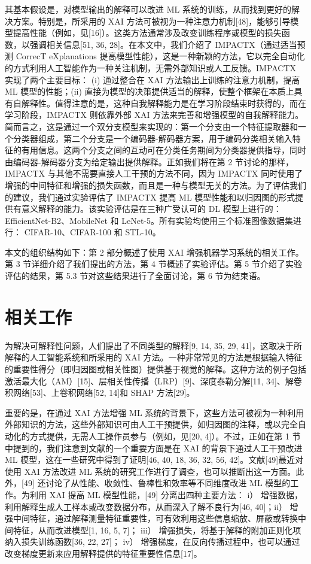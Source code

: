 \documentclass[12pt, a4paper]{ctexart} %
\begin{document}
其基本假设是，对模型输出的解释可以改进 ML 系统的训练，从而找到更好的解决方案。特别是，所采用的 XAI 方法可被视为一种注意力机制[48]，能够引导模型提高性能（例如，见[16]）。这类方法通常涉及改变训练程序或模型的损失函数，以强调相关信息[51, 36, 28]。在本文中，我们介绍了 IMPACTX（通过适当预测 CorrecT eXplanations 提高模型性能），这是一种新颖的方法，它以完全自动化的方式利用人工智能作为一种关注机制，无需外部知识或人工反馈。IMPACTX 实现了两个主要目标： (i) 通过整合在 XAI 方法输出上训练的注意力机制，提高 ML 模型的性能；(ii) 直接为模型的决策提供适当的解释，使整个框架在本质上具有自解释性。值得注意的是，这种自我解释能力是在学习阶段结束时获得的，而在学习阶段，IMPACTX 则依靠外部 XAI 方法来完善和增强模型的自我解释能力。简而言之，这是通过一个双分支模型来实现的：第一个分支由一个特征提取器和一个分类器组成，第二个分支是一个编码器-解码器方案，用于编码分类相关输入特征的有用信息。这两个分支之间的互动可在分类任务期间为分类器提供指导，同时由编码器-解码器分支为给定输出提供解释。正如我们将在第 2 节讨论的那样，IMPACTX 与其他不需要直接人工干预的方法不同，因为 IMPACTX 同时使用了增强的中间特征和增强的损失函数，而且是一种与模型无关的方法。为了评估我们的建议，我们通过实验评估了 IMPACTX 提高 ML 模型性能和以归因图的形式提供有意义解释的能力。该实验评估是在三种广受认可的 DL 模型上进行的： EfficientNet-B2、MobileNet 和 LeNet-5。所有实验均使用三个标准图像数据集进行： CIFAR-10、CIFAR-100 和 STL-10。

本文的组织结构如下：第 2 部分概述了使用 XAI 增强机器学习系统的相关工作。第 3 节详细介绍了我们提出的方法，第 4 节概述了实验评估。第 5 节介绍了实验评估的结果，第 5.3 节对这些结果进行了全面讨论，第 6 节为结束语。

\section{相关工作}
为解决可解释性问题，人们提出了不同类型的解释[9, 14, 35, 29, 41]，这取决于所解释的人工智能系统和所采用的 XAI 方法。一种非常常见的方法是根据输入特征的重要性得分（即归因图或相关性图）提供基于视觉的解释。这种方法的例子包括激活最大化（AM）[15]、层相关性传播（LRP）[9]、深度泰勒分解[11, 34]、解卷积网络[53]、上卷积网络[52, 14]和 SHAP 方法[29]。

重要的是，在通过 XAI 方法增强 ML 系统的背景下，这些方法可被视为一种利用外部知识的方法，这些外部知识可由人工干预提供，如归因图的注释，或以完全自动化的方式提供，无需人工操作员参与（例如，见[20, 4]）。不过，正如在第 1 节中提到的，我们注意到文献的一个重要方面是在 XAI 的背景下通过人工干预改进 ML 模型，这在一些研究中得到了证明[46, 40, 18, 36, 32, 56, 42]。文献[49]最近对使用 XAI 方法改进 ML 系统的研究工作进行了调查，也可以推断出这一方面。此外，[49] 还讨论了从性能、收敛性、鲁棒性和效率等不同维度改进 ML 模型的工作。为利用 XAI 提高 ML 模型性能，[49] 分离出四种主要方法： i） 增强数据，利用解释生成人工样本或改变数据分布，从而深入了解不良行为[46, 40]；ii） 增强中间特征，通过解释测量特征重要性，可有效利用这些信息缩放、屏蔽或转换中间特征，从而改进模型[1, 16, 5, 7]； iii） 增强损失，将基于解释的附加正则化项纳入损失训练函数[36, 22, 27]； iv） 增强梯度，在反向传播过程中，也可以通过改变梯度更新来应用解释提供的特征重要性信息[17]。
\end{document}
